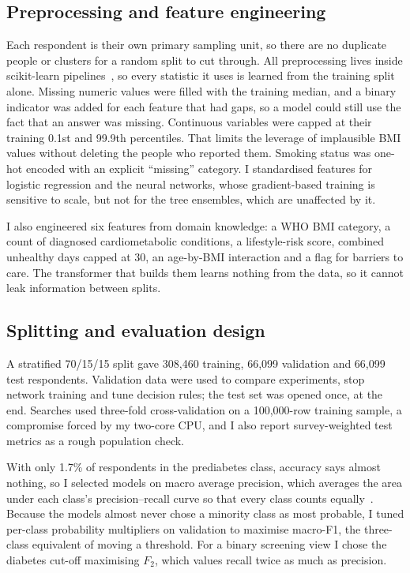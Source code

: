 \subsection{Preprocessing and feature engineering}
Each respondent is their own primary sampling unit, so there are no duplicate people or clusters for a random split to cut through. All preprocessing lives inside scikit-learn pipelines~\cite{pedregosa2011}, so every statistic it uses is learned from the training split alone. Missing numeric values were filled with the training median, and a binary indicator was added for each feature that had gaps, so a model could still use the fact that an answer was missing. Continuous variables were capped at their training 0.1st and 99.9th percentiles. That limits the leverage of implausible BMI values without deleting the people who reported them. Smoking status was one-hot encoded with an explicit ``missing'' category. I standardised features for logistic regression and the neural networks, whose gradient-based training is sensitive to scale, but not for the tree ensembles, which are unaffected by it.

I also engineered six features from domain knowledge: a WHO BMI category, a count of diagnosed cardiometabolic conditions, a lifestyle-risk score, combined unhealthy days capped at 30, an age-by-BMI interaction and a flag for barriers to care. The transformer that builds them learns nothing from the data, so it cannot leak information between splits.

\subsection{Splitting and evaluation design}
A stratified 70/15/15 split gave 308,460 training, 66,099 validation and 66,099 test respondents. Validation data were used to compare experiments, stop network training and tune decision rules; the test set was opened once, at the end. Searches used three-fold cross-validation on a 100,000-row training sample, a compromise forced by my two-core CPU, and I also report survey-weighted test metrics as a rough population check.

With only 1.7\% of respondents in the prediabetes class, accuracy says almost nothing, so I selected models on macro average precision, which averages the area under each class's precision--recall curve so that every class counts equally~\cite{saito2015}. Because the models almost never chose a minority class as most probable, I tuned per-class probability multipliers on validation to maximise macro-F1, the three-class equivalent of moving a threshold. For a binary screening view I chose the diabetes cut-off maximising $F_2$, which values recall twice as much as precision.

